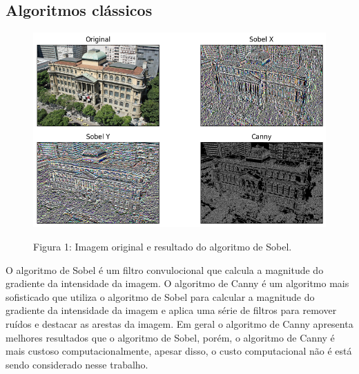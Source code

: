 \documentclass[12pt]{article}
\begin{document}
\subsection{Algoritmos clássicos}


\begin{figure}[H]
\centering
\includegraphics[scale=0.70]{sobel.png}
\label{fig:sobel}
\begin{center}
Figura 1: Imagem original e resultado do algoritmo de Sobel.
\end{center}
\end{figure}

O algoritmo de Sobel é um filtro convulocional que calcula a magnitude do gradiente da intensidade da imagem. O algoritmo de Canny é um algoritmo mais sofisticado que utiliza o algoritmo de Sobel para calcular a magnitude do gradiente da intensidade da imagem e aplica uma série de filtros para remover ruídos e destacar as arestas da imagem. Em geral o algoritmo de Canny apresenta melhores resultados que o algoritmo de Sobel, porém, o algoritmo de Canny é mais custoso computacionalmente, apesar disso, o custo computacional não é está sendo considerado nesse trabalho.
\end{document}
